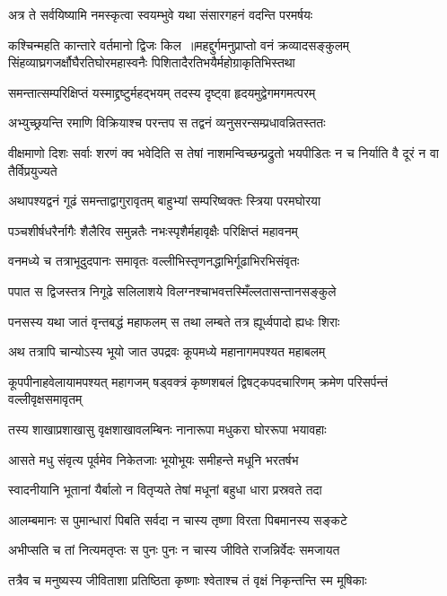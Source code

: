 \twolineshloka
{अत्र ते सर्वयिष्यामि नमस्कृत्वा स्वयम्भुवे}
{यथा संसारगहनं वदन्ति परमर्षयः}


कश्चिन्महति कान्तारे वर्तमानो द्विजः किल ॥महद्दुर्गमनुप्राप्तो वनं क्रव्यादसङ्कुलम्
\twolineshloka
{सिंहव्याघ्रगजर्क्षौघैरतिघोरमहास्वनैः}
{पिशितादैरतिभयैर्महोग्राकृतिभिस्तथा}


\twolineshloka
{समन्तात्सम्परिक्षिप्तं यस्माद्द्रष्टुर्महद्भयम्}
{तदस्य दृष्ट्वा हृदयमुद्वेगमगमत्परम्}


\twolineshloka
{अभ्युच्छ्रयन्ति रमाणि विक्रियाश्च परन्तप}
{स तद्वनं व्यनुसरन्सम्प्रधावन्नितस्ततः}


\threelineshloka
{वीक्षमाणो दिशः सर्वाः शरणं क्व भवेदिति}
{स तेषां नाशमन्विच्छन्प्रद्रुतो भयपीडितः}
{न च निर्याति वै दूरं न वा तैर्विप्रयुज्यते}


\twolineshloka
{अथापश्यद्वनं गूढं समन्ताद्वागुरावृतम्}
{बाहुभ्यां सम्परिष्वक्तः स्त्रिया परमघोरया}


\twolineshloka
{पञ्चशीर्षधरैर्नागैः शैलैरिव समुन्नतैः}
{नभःस्पृशैर्महावृक्षैः परिक्षिप्तं महावनम्}


\twolineshloka
{वनमध्ये च तत्राभूदुदपानः समावृतः}
{वल्लीभिस्तृणनद्धाभिर्गूढाभिरभिसंवृतः}


\twolineshloka
{पपात स द्विजस्तत्र निगूढे सलिलाशये}
{विलग्नश्चाभवत्तस्मिँल्लतासन्तानसङ्कुले}


\twolineshloka
{पनसस्य यथा जातं वृन्तबद्धं महाफलम्}
{स तथा लम्बते तत्र ह्यूर्ध्वपादो ह्यधः शिराः}


\twolineshloka
{अथ तत्रापि चान्योऽस्य भूयो जात उपद्रवः}
{कूपमध्ये महानागमपश्यत महाबलम्}


कूपपीनाहवेलायामपश्यत् महागजम्
\twolineshloka
{षड्वक्त्रं कृष्णशबलं द्विषट्कपदचारिणम्}
{क्रमेण परिसर्पन्तं वल्लीवृक्षसमावृतम्}


\twolineshloka
{तस्य शाखाप्रशाखासु वृक्षशाखावलम्बिनः}
{नानारूपा मधुकरा घोररूपा भयावहाः}


\twolineshloka
{आसते मधु संवृत्य पूर्वमेव निकेतजाः}
{भूयोभूयः समीहन्ते मधूनि भरतर्षभ}


\twolineshloka
{स्वादनीयानि भूतानां यैर्बालो न वितृप्यते}
{तेषां मधूनां बहुधा धारा प्रस्रवते तदा}


\twolineshloka
{आलम्बमानः स पुमान्धारां पिबति सर्वदा}
{न चास्य तृष्णा विरता पिबमानस्य सङ्कटे}


\twolineshloka
{अभीप्सति च तां नित्यमतृप्तः स पुनः पुनः}
{न चास्य जीविते राजन्निर्वेदः समजायत}


\twolineshloka
{तत्रैव च मनुष्यस्य जीविताशा प्रतिष्ठिता}
{कृष्णाः श्वेताश्च तं वृक्षं निकृन्तन्ति स्म मूषिकाः}


